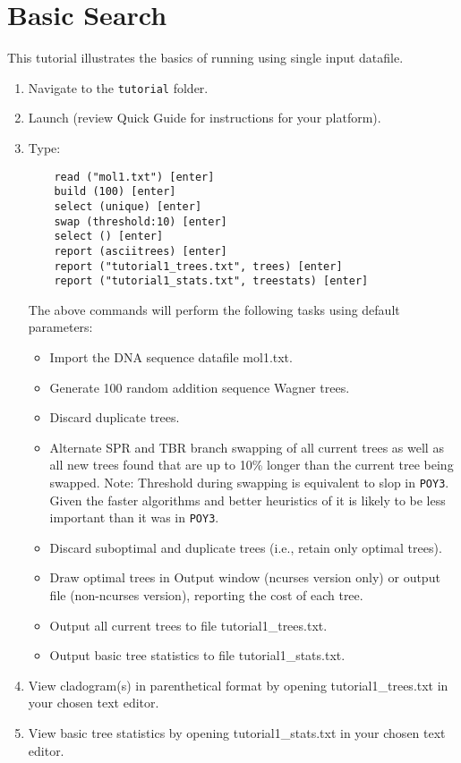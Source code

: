 \section{Basic Search}{\label{tutorial2}}

This tutorial illustrates the basics of running \poy using single input datafile. 
\begin{enumerate}
\item Navigate to the \texttt{tutorial} folder. 
\item Launch \poy (review \poy Quick Guide for instructions for your platform).
\item Type:

    \begin{verbatim}
    read ("mol1.txt") [enter]
    build (100) [enter]
    select (unique) [enter]
    swap (threshold:10) [enter]
    select () [enter]
    report (asciitrees) [enter]
    report ("tutorial1_trees.txt", trees) [enter]
    report ("tutorial1_stats.txt", treestats) [enter]
    \end{verbatim}

The above commands will perform the following tasks using default parameters:
\begin{itemize}
\item  Import the DNA sequence datafile mol1.txt.
\item  Generate 100 random addition sequence Wagner trees.
\item  Discard duplicate trees.
\item  Alternate SPR and TBR branch swapping of all current trees as well as all 
new trees found that are up to 10\%
longer than the current tree being 
swapped. Note: Threshold during swapping is equivalent to slop in \texttt{POY3}. 
Given the faster algorithms and better heuristics of \poy it is likely to 
be less important than it was in \texttt{POY3}.
\item  Discard suboptimal and duplicate trees (i.e., retain only optimal trees).
\item  Draw optimal trees in \poy Output window (ncurses version only) or output 
file (non-ncurses version), reporting the cost of each tree.
\item  Output all current trees to file tutorial1\_trees.txt.
\item  Output basic tree statistics to file tutorial1\_stats.txt.
\end{itemize}

\item View cladogram(s) in parenthetical format by opening tutorial1\_trees.txt in 
your chosen text editor.
\item View basic tree statistics by opening tutorial1\_stats.txt in your chosen 
text editor.
\end{enumerate}

